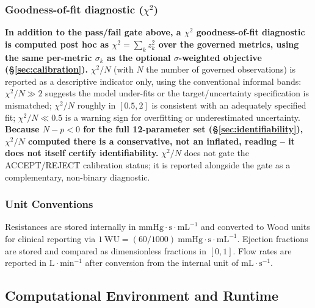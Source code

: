 \documentclass{article}
\begin{document}
\subsubsection{Goodness-of-fit diagnostic ($\chi^2$)}
\label{sec:chi2}

\textbf{In addition to the pass/fail gate above, a $\chi^2$ goodness-of-fit
diagnostic is computed post hoc as $\chi^2 = \sum_k z_k^2$ over the governed
metrics, using the same per-metric $\sigma_k$ as the optional $\sigma$-weighted
objective (\S\ref{sec:calibration}).} $\chi^2/N$ (with $N$ the number of
governed observations) is reported as a descriptive indicator only, using the
conventional informal bands: $\chi^2/N \gg 2$ suggests the model
under-fits or the target/uncertainty specification is mismatched;
$\chi^2/N$ roughly in $[0.5, 2]$ is consistent with an adequately specified
fit; $\chi^2/N \ll 0.5$ is a warning sign for overfitting or
underestimated uncertainty. \textbf{Because $N-p<0$ for the full
12-parameter set (\S\ref{sec:identifiability}), $\chi^2/N$ computed there is
a conservative, not an inflated, reading -- it does not itself certify
identifiability.} $\chi^2/N$ does not gate the ACCEPT/REJECT
calibration status; it is reported alongside the gate as a complementary,
non-binary diagnostic.

\subsubsection{Unit Conventions}

Resistances are stored internally in
$\mathrm{mmHg{\cdot}s{\cdot}mL^{-1}}$ and converted to Wood
units for clinical reporting via $1\ \mathrm{WU} =
(60/1000)\ \mathrm{mmHg{\cdot}s{\cdot}mL^{-1}}$. Ejection
fractions are stored and compared as dimensionless fractions
in $[0, 1]$. Flow rates are reported in
$\mathrm{L{\cdot}min^{-1}}$ after conversion from the internal
unit of $\mathrm{mL{\cdot}s^{-1}}$.

\subsection{Computational Environment and Runtime}
\label{sec:implementation}
\end{document}
